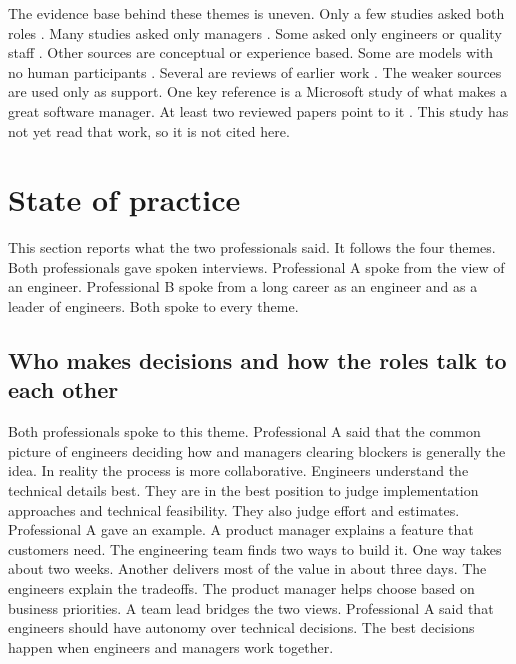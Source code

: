\documentclass[conference]{IEEEtran}
\begin{document}
The evidence base behind these themes is uneven. Only a few studies asked both roles \cite{knauss2018,weir2023,graetsch2023,pisirir2023,amorim2020,wagenaar2018}. Many studies asked only managers \cite{nguyen2016a,nguyen2016b,nguyen2016c,tarawneh2018,tarawneh2019,afshari2018,suwarno2025}. Some asked only engineers or quality staff \cite{zoric2018,farias2025,qureshi2013}. Other sources are conceptual or experience based. Some are models with no human participants \cite{kurt2024,babu2025,bahi2024,pashchenko2025,yeh2024}. Several are reviews of earlier work \cite{kalluri2025,assalaarachchi2025,zhang2026}. The weaker sources are used only as support. One key reference is a Microsoft study of what makes a great software manager. At least two reviewed papers point to it \cite{farias2025,babu2025}. This study has not yet read that work, so it is not cited here.

\section{State of practice}

This section reports what the two professionals said. It follows the four themes. Both professionals gave spoken interviews. Professional A spoke from the view of an engineer. Professional B spoke from a long career as an engineer and as a leader of engineers. Both spoke to every theme.

\subsection{Who makes decisions and how the roles talk to each other}

Both professionals spoke to this theme. Professional A said that the common picture of engineers deciding how and managers clearing blockers is generally the idea. In reality the process is more collaborative. Engineers understand the technical details best. They are in the best position to judge implementation approaches and technical feasibility. They also judge effort and estimates. Professional A gave an example. A product manager explains a feature that customers need. The engineering team finds two ways to build it. One way takes about two weeks. Another delivers most of the value in about three days. The engineers explain the tradeoffs. The product manager helps choose based on business priorities. A team lead bridges the two views. Professional A said that engineers should have autonomy over technical decisions. The best decisions happen when engineers and managers work together.
\end{document}
